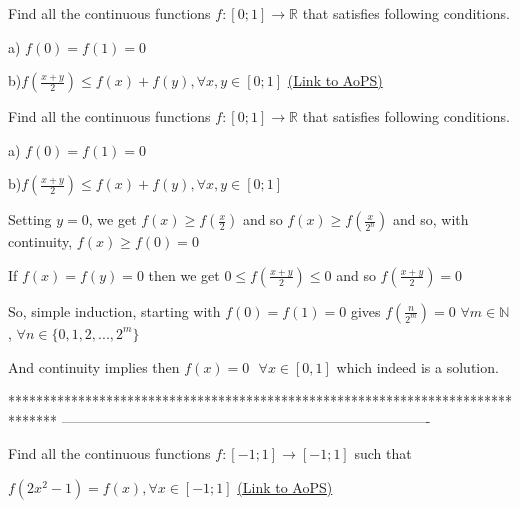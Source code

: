\begin{problem}
	Find all the  continuous functions $f:\left [ 0;1 \right ]\rightarrow \mathbb{R}  $   that satisfies following conditions.

a) $f(0)=f(1)=0$

b)$f\left ( \frac{x+y}{2} \right )\leq f(x)+f(y),\forall x,y\in \left [ 0;1 \right ]$
	\flushright \href{https://artofproblemsolving.com/community/c6h618502}{(Link to AoPS)}
\end{problem}



\begin{solution}
	\begin{tcolorbox}Find all the  continuous functions $f:\left [ 0;1 \right ]\rightarrow \mathbb{R}  $   that satisfies following conditions.

a) $f(0)=f(1)=0$

b)$f\left ( \frac{x+y}{2} \right )\leq f(x)+f(y),\forall x,y\in \left [ 0;1 \right ]$\end{tcolorbox}
Setting $y=0$, we get $f(x)\ge f(\frac x2)$ and so $f(x)\ge f(\frac x{2^n})$ and so, with continuity, $f(x)\ge f(0)=0$

If $f(x)=f(y)=0$ then we get $0\le f(\frac{x+y}2)\le 0$ and so $f(\frac {x+y}2)=0$

So, simple induction, starting with $f(0)=f(1)=0$ gives $f(\frac n{2^m})=0$ $\forall m\in\mathbb N$, $\forall n\in\{0,1,2,...,2^m\}$

And continuity implies then $\boxed{f(x)=0\text{  }\forall x\in[0,1]}$ which indeed is a solution.
\end{solution}
*******************************************************************************
-------------------------------------------------------------------------------

\begin{problem}
	Find all the continuous functions $ f: [ -1;1  ]\rightarrow  [ -1;1  ]  $ such that  
                                                                          
$f ( 2x^{2}  -1)=f ( x  ),\forall x\in  [ -1;1  ]$
	\flushright \href{https://artofproblemsolving.com/community/c6h618507}{(Link to AoPS)}
\end{problem}



